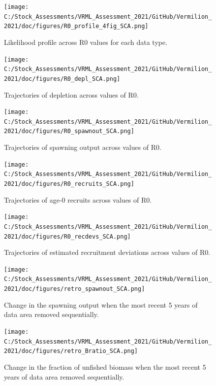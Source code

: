 \documentclass[
  english,
  a4paper,
]{article}
\begin{document}
\begin{figure}
\centering
\texttt{[image: C:/Stock\_Assessments/VRML\_Assessment\_2021/GitHub/Vermilion\_2021/doc/figures/R0\_profile\_4fig\_SCA.png]}
\caption{Likelihood profile across R0 values for each data type.\label{fig:r0-profile}}
\end{figure}

\begin{figure}
\centering
\texttt{[image: C:/Stock\_Assessments/VRML\_Assessment\_2021/GitHub/Vermilion\_2021/doc/figures/R0\_depl\_SCA.png]}
\caption{Trajectories of depletion across values of R0.\label{fig:r0-depl}}
\end{figure}

\begin{figure}
\centering
\texttt{[image: C:/Stock\_Assessments/VRML\_Assessment\_2021/GitHub/Vermilion\_2021/doc/figures/R0\_spawnout\_SCA.png]}
\caption{Trajectories of spawning output across values of R0.\label{fig:r0-spawn}}
\end{figure}

\begin{figure}
\centering
\texttt{[image: C:/Stock\_Assessments/VRML\_Assessment\_2021/GitHub/Vermilion\_2021/doc/figures/R0\_recruits\_SCA.png]}
\caption{Trajectories of age-0 recruits across values of R0.\label{fig:r0-recruits}}
\end{figure}

\begin{figure}
\centering
\texttt{[image: C:/Stock\_Assessments/VRML\_Assessment\_2021/GitHub/Vermilion\_2021/doc/figures/R0\_recdevs\_SCA.png]}
\caption{Trajectories of estimated recruitment deviations across values of R0.\label{fig:r0-recdevs}}
\end{figure}

\begin{figure}
\centering
\texttt{[image: C:/Stock\_Assessments/VRML\_Assessment\_2021/GitHub/Vermilion\_2021/doc/figures/retro\_spawnout\_SCA.png]}
\caption{Change in the spawning output when the most recent 5 years of data area removed sequentially.\label{fig:retro-spawnb}}
\end{figure}

\begin{figure}
\centering
\texttt{[image: C:/Stock\_Assessments/VRML\_Assessment\_2021/GitHub/Vermilion\_2021/doc/figures/retro\_Bratio\_SCA.png]}
\caption{Change in the fraction of unfished biomass when the most recent 5 years of data area removed sequentially.\label{fig:retro-bratio}}
\end{figure}
\end{document}
